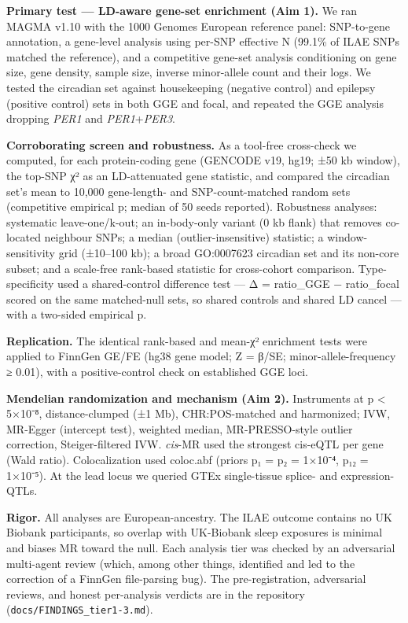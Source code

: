 \documentclass[
]{article}
\begin{document}
\textbf{Primary test --- LD-aware gene-set enrichment (Aim 1).} We ran
MAGMA v1.10 with the 1000 Genomes European reference panel: SNP-to-gene
annotation, a gene-level analysis using per-SNP effective N (99.1\% of
ILAE SNPs matched the reference), and a competitive gene-set analysis
conditioning on gene size, gene density, sample size, inverse
minor-allele count and their logs. We tested the circadian set against
housekeeping (negative control) and epilepsy (positive control) sets in
both GGE and focal, and repeated the GGE analysis dropping \emph{PER1}
and \emph{PER1}+\emph{PER3}.

\textbf{Corroborating screen and robustness.} As a tool-free cross-check
we computed, for each protein-coding gene (GENCODE v19, hg19; ±50 kb
window), the top-SNP χ² as an LD-attenuated gene statistic, and compared
the circadian set's mean to 10,000 gene-length- and SNP-count-matched
random sets (competitive empirical p; median of 50 seeds reported).
Robustness analyses: systematic leave-one/\hspace{0pt}k-out; an
in-body-only variant (0 kb flank) that removes co-located neighbour
SNPs; a median (outlier-insensitive) statistic; a window-sensitivity
grid (±10--100 kb); a broad GO:0007623 circadian set and its non-core
subset; and a scale-free rank-based statistic for cross-cohort
comparison. Type-specificity used a shared-control difference test --- Δ
= ratio\_GGE − ratio\_focal scored on the same matched-null sets, so
shared controls and shared LD cancel --- with a two-sided empirical p.

\textbf{Replication.} The identical rank-based and mean-χ² enrichment
tests were applied to FinnGen GE/FE (hg38 gene model; Z = β/SE;
minor-allele-frequency ≥ 0.01), with a positive-control check on
established GGE loci.

\textbf{Mendelian randomization and mechanism (Aim 2).} Instruments at p
\textless{} 5×10⁻⁸, distance-clumped (±1 Mb), CHR:POS-matched and
harmonized; IVW, MR-Egger (intercept test), weighted median,
MR-PRESSO-style outlier correction, Steiger-filtered IVW. \emph{cis}-MR
used the strongest cis-eQTL per gene (Wald ratio). Colocalization used
coloc.abf (priors p₁ = p₂ = 1×10⁻⁴, p₁₂ = 1×10⁻⁵). At the lead locus we
queried GTEx single-tissue splice- and expression-QTLs.

\textbf{Rigor.} All analyses are European-ancestry. The ILAE outcome
contains no UK Biobank participants, so overlap with UK-Biobank sleep
exposures is minimal and biases MR toward the null. Each analysis tier
was checked by an adversarial multi-agent review (which, among other
things, identified and led to the correction of a FinnGen file-parsing
bug). The pre-registration, adversarial reviews, and honest per-analysis
verdicts are in the repository (\texttt{docs/FINDINGS\_tier1-3.md}).
\end{document}
